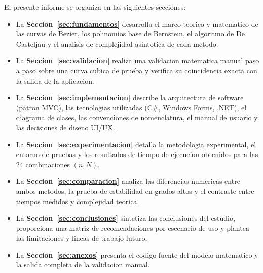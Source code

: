 El presente informe se organiza en las siguientes secciones:

\begin{itemize}
    \item La \textbf{Seccion~\ref{sec:fundamentos}} desarrolla el marco teorico y matematico de las curvas de Bezier, los polinomios base de Bernstein, el algoritmo de De Casteljau y el analisis de complejidad asintotica de cada metodo.
    \item La \textbf{Seccion~\ref{sec:validacion}} realiza una validacion matematica manual paso a paso sobre una curva cubica de prueba y verifica su coincidencia exacta con la salida de la aplicacion.
    \item La \textbf{Seccion~\ref{sec:implementacion}} describe la arquitectura de software (patron MVC), las tecnologias utilizadas (C\#, Windows Forms, .NET), el diagrama de clases, las convenciones de nomenclatura, el manual de usuario y las decisiones de diseno UI/UX.
    \item La \textbf{Seccion~\ref{sec:experimentacion}} detalla la metodologia experimental, el entorno de pruebas y los resultados de tiempo de ejecucion obtenidos para las $24$ combinaciones $(n, N)$.
    \item La \textbf{Seccion~\ref{sec:comparacion}} analiza las diferencias numericas entre ambos metodos, la prueba de estabilidad en grados altos y el contraste entre tiempos medidos y complejidad teorica.
    \item La \textbf{Seccion~\ref{sec:conclusiones}} sintetiza las conclusiones del estudio, proporciona una matriz de recomendaciones por escenario de uso y plantea las limitaciones y lineas de trabajo futuro.
    \item La \textbf{Seccion~\ref{sec:anexos}} presenta el codigo fuente del modelo matematico y la salida completa de la validacion manual.
\end{itemize}
